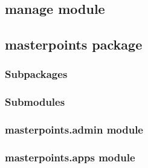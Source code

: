 \documentclass[letterpaper,10pt,english]{sphinxmanual}
\begin{document}
\subsection{manage module}
\label{\detokenize{manage:module-manage}}\label{\detokenize{manage:manage-module}}\label{\detokenize{manage::doc}}

\subsection{masterpoints package}
\label{\detokenize{masterpoints:masterpoints-package}}\label{\detokenize{masterpoints::doc}}

\subsubsection{Subpackages}
\label{\detokenize{masterpoints:subpackages}}

\subsubsection{Submodules}
\label{\detokenize{masterpoints:submodules}}

\subsubsection{masterpoints.admin module}
\label{\detokenize{masterpoints:module-masterpoints.admin}}\label{\detokenize{masterpoints:masterpoints-admin-module}}

\subsubsection{masterpoints.apps module}
\label{\detokenize{masterpoints:module-masterpoints.apps}}\label{\detokenize{masterpoints:masterpoints-apps-module}}
\end{document}
